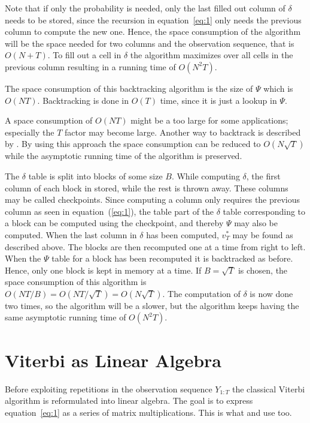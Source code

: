 Note that if only the probability is needed, only the last filled out column of
$\delta$ needs to be stored, since the recursion in equation~\eqref{eq:1} only
needs the previous column to compute the new one. Hence, the space consumption
of the algorithm will be the space needed for two columns and the observation
sequence, that is $O(N + T)$. To fill out a cell in $\delta$ the algorithm
maximizes over all cells in the previous column resulting in a running time of
$O(N^2 T)$.

The space consumption of this backtracking algorithm is the size of $\Psi$
which is $O(N T)$. Backtracking is done in $O(T)$ time, since it is just a
lookup in $\Psi$.

A space consumption of $O(N T)$ might be a too large for some applications;
especially the $T$ factor may become large. Another way to backtrack is
described by \citet{Tarnas01061998}. By using this approach the space
consumption can be reduced to $O(N \sqrt{T})$ while the asymptotic running
time of the algorithm is preserved.

The $\delta$ table is split into blocks of some size $B$. While computing
$\delta$, the first column of each block in stored, while the rest is thrown
away. These columns may be called checkpoints. Since computing a column only
requires the previous column as seen in equation~(\ref{eq:1}), the table part
of the $\delta$ table corresponding to a block can be computed using the
checkpoint, and thereby $\Psi$ may also be computed. When the last column in
$\delta$ has been computed, $v_T^*$ may be found as described above. The blocks
are then recomputed one at a time from right to left. When the $\Psi$ table for
a block has been recomputed it is backtracked as before. Hence, only one block
is kept in memory at a time. If $B = \sqrt{T}$ is chosen, the space consumption
of this algorithm is
$O(N T / B) = O(N T / \sqrt{T}) = O(N \sqrt{T})$. The computation
of $\delta$ is now done two times, so the algorithm will be a slower, but the
algorithm keeps having the same asymptotic running time of $O(N^2 T)$.

\section{Viterbi as Linear Algebra}
\label{sec:algorithm-as-linear}

Before exploiting repetitions in the observation sequence $Y_{1:T}$ the
classical Viterbi algorithm is reformulated into linear algebra. The goal is to
express equation~\eqref{eq:1} as a series of matrix multiplications. This is
what \citet{sand2013ziphmmlib} and \citet{lifshits2009speeding} use too.

